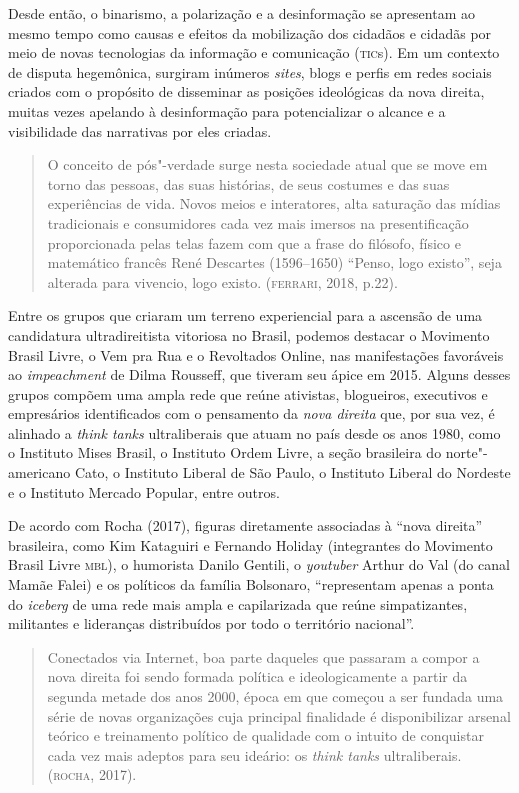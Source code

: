 Desde então, o binarismo, a polarização e a desinformação se apresentam
ao mesmo tempo como causas e efeitos da mobilização dos cidadãos e
cidadãs por meio de novas tecnologias da informação e comunicação
(\textsc{tic}s). Em um contexto de disputa hegemônica, surgiram inúmeros
\textit{sites}, blogs e perfis em redes sociais criados com o propósito de
disseminar as posições ideológicas da nova direita, muitas vezes
apelando à desinformação para potencializar o alcance e a visibilidade
das narrativas por eles criadas.

\begin{quote}
O conceito de pós"-verdade surge nesta sociedade atual que se move em
torno das pessoas, das suas histórias, de seus costumes e das suas
experiências de vida. Novos meios e interatores, alta saturação das
mídias tradicionais e consumidores cada vez mais imersos na
presentificação proporcionada pelas telas fazem com que a frase do
filósofo, físico e matemático francês René Descartes (1596--1650)
``Penso, logo existo'', seja alterada para vivencio, logo existo.
(\textsc{ferrari}, 2018, p.22).
\end{quote}

Entre os grupos que criaram um terreno experiencial para a ascensão de
uma candidatura ultradireitista vitoriosa no Brasil, podemos destacar o
Movimento Brasil Livre, o Vem pra Rua e o Revoltados Online, nas
manifestações favoráveis ao \textit{impeachment} de Dilma Rousseff, que
tiveram seu ápice em 2015. Alguns desses grupos compõem uma ampla rede
que reúne ativistas, blogueiros, executivos e empresários identificados
com o pensamento da \textit{nova direita} que, por sua vez, é alinhado a
\textit{think tanks} ultraliberais que atuam no país desde os anos 1980,
como o Instituto Mises Brasil, o Instituto Ordem Livre, a seção
brasileira do norte"-americano Cato, o Instituto Liberal de São Paulo, o
Instituto Liberal do Nordeste e o Instituto Mercado Popular, entre
outros.

De acordo com Rocha (2017), figuras diretamente associadas à ``nova
direita'' brasileira, como Kim Kataguiri e Fernando Holiday (integrantes
do Movimento Brasil Livre \textsc{mbl}), o humorista Danilo Gentili, o
\textit{youtuber} Arthur do Val (do canal Mamãe Falei) e os políticos da
família Bolsonaro, ``representam apenas a ponta do \textit{iceberg} de uma
rede mais ampla e capilarizada que reúne simpatizantes, militantes e
lideranças distribuídos por todo o território nacional''.

\begin{quote}
Conectados via Internet, boa parte daqueles que passaram a compor a nova
direita foi sendo formada política e ideologicamente a partir da segunda
metade dos anos 2000, época em que começou a ser fundada uma série de
novas organizações cuja principal finalidade é disponibilizar arsenal
teórico e treinamento político de qualidade com o intuito de conquistar
cada vez mais adeptos para seu ideário: os \textit{think tanks} ultraliberais.
(\textsc{rocha}, 2017).
\end{quote}

